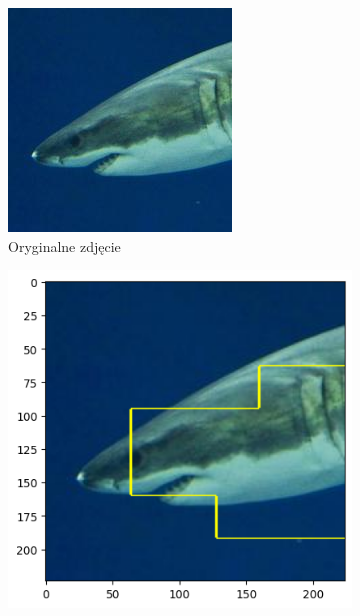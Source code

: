 \begin{figure}[h]
	\centering
	\begin{subfigure}[b]{0.3\textwidth}
		\includegraphics[width=.9\textwidth]{img/examples/appendix/n01484850_19435}
		\caption{Oryginalne zdjęcie}  \label{}
	\end{subfigure}
	\begin{subfigure}[b]{0.3\textwidth}
		\centering\includegraphics[width=.9\textwidth]{img/examples/appendix/n01484850_19435_gradcam}

\end{subfigure}
\end{figure}
